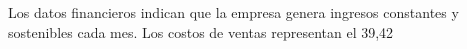 

Los datos financieros indican que la empresa genera ingresos constantes y sostenibles cada mes. Los costos de ventas representan el 39,42%
